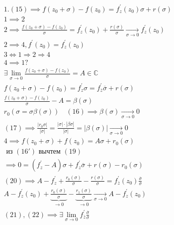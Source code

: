 \documentclass[main]{subfiles}
\begin{document}
\begin{longProof}
    \begin{gather*}
        1. (15) \implies f(z_0 + \sigma) - f(z_0) = f^\prime_z(z_0) \sigma + r(\sigma) \\
         1 \implies 2  \\
         2 \implies \frac{f(z_0 + \sigma)-f(z_0)}{\sigma} = f^\prime_z(z_0) + \frac{r(\sigma)}{\sigma} \underset{\sigma \to 0}{ \longrightarrow} f^\prime_z(z_0) \\
        2 \implies 4, f^\prime(z_0) = f^\prime_z(z_0) \\
        3 \Leftrightarrow 1 \Rightarrow 2 \Rightarrow 4 \\
        4 \implies 1 ? \\
        \exists \underset{\sigma \to 0}{\lim} \frac{f(z_0 + \sigma) - f(z_0)}{\sigma} = A \in \mathbb{C} \tag{16} \\
        f(z_0 + \sigma) - f(z_0) = f^\prime_z \sigma = f^\prime_{\overline{z}} \overline{\sigma} + r(\sigma) \tag{16\prime}\\
        \frac{f(z_0 + \sigma) - f(z_0)}{\sigma} - A = \beta(\sigma) \\
        r_0(\sigma = \sigma \beta(\sigma)) \quad (16) \implies \beta(\sigma) \underset{\sigma \to 0}{\longrightarrow} 0 \tag{17}\\
        (17) \implies \frac{|r_0\sigma|}{|\sigma|} = \frac{|\sigma| \cdot |\beta{\sigma}|}{|\sigma|} = |\beta(\sigma)| \underset{\sigma \to 0}{\longrightarrow} 0 \tag{18}\\
        4 \implies f(z_0 + \sigma) + f(z_0) = A\sigma + r_0(\sigma) \tag{19}\\
        \text{ из } (16\prime) \text{ вычтем } (19)  \\
         \implies 0 = (f^\prime_z - A) \sigma  + f^\prime_z \overline{\sigma } + r(\sigma) - r_0(\sigma)\tag{20} \\
        (20) \implies A - f^\prime_z + \frac{r_0(\sigma)}{\sigma} - \frac{r(\sigma)}{\sigma} = f^\prime_{\overline{z}}(z_0) \frac{\overline{\sigma}}{\sigma} \tag{21} \\
        A - f^\prime_z(z_0) + \underbrace{\frac{r_0(\sigma)}{\sigma}}_{\to 0} - \underbrace{\frac{r_1(\sigma)}{\sigma}}_{\to 0} \underset{\sigma \to 0}{\longrightarrow} A - f^\prime_z(z_0) \tag{22}\\
        (21), (22) \implies \exists \underset{\sigma \to 0}{\lim} f^\prime_{\overline{z{}}} \frac{\overline{\sigma}}{\sigma} \tag{23} \\
    \end{gather*}

\end{longProof}
\end{document}
